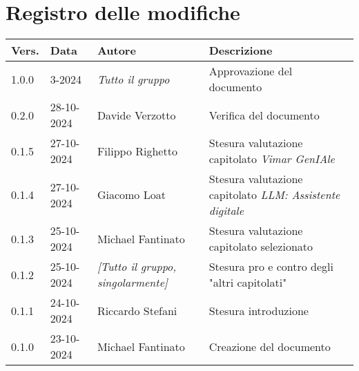 \section*{Registro delle modifiche}

\begin{table}[h]
    \centering
    \begin{tabular}{|l|l|p{3cm}|p{5cm}|}
        \hline
        \rowcolor[gray]{0.9}
        \textbf{Vers.} & \textbf{Data} & \textbf{Autore} & \textbf{Descrizione}\\
        \hline
        1.0.0 & 3-2024 & \emph{Tutto il gruppo} & Approvazione del documento\\
        \hline
        0.2.0 & 28-10-2024 & Davide Verzotto & Verifica del documento\\
        \hline
        0.1.5 & 27-10-2024 & Filippo Righetto & Stesura valutazione capitolato \emph{Vimar GenIAle}\\
        \hline
        0.1.4 & 27-10-2024 & Giacomo Loat & Stesura valutazione capitolato \emph{LLM: Assistente digitale}\\
        \hline
        0.1.3 & 25-10-2024 & Michael Fantinato & Stesura valutazione capitolato selezionato\\
        \hline
        0.1.2 & 25-10-2024 & \emph{[Tutto il gruppo, singolarmente]} & Stesura pro e contro degli "altri capitolati"\\
        \hline
        0.1.1 & 24-10-2024 & Riccardo Stefani & Stesura introduzione\\
        \hline
        0.1.0 & 23-10-2024 & Michael Fantinato & Creazione del documento\\
        \hline
    \end{tabular}
\end{table}
